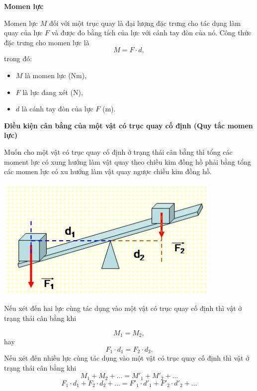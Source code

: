 
\setcounter{section}{0}
\textbf{Momen lực}

Momen lực $M$ đối với một trục quay là đại lượng đặc trưng cho tác dụng làm quay của lực $F$ và được đo bằng tích của lực với cánh tay đòn của nó. Công thức đặc trưng cho momen lực là 
\begin{equation*}
	M = F\cdot d, \label{eq1}
\end{equation*}
trong đó: 
\begin{itemize}
	\item $M$ là momen lực ($\textrm{Nm}$), 
	\item $F$ là lực đang xét ($\textrm{N}$),
	\item $d$ là cánh tay đòn của lực $F$ ($\textrm{m}$).
\end{itemize}

\textbf{Điều kiện cân bằng của một vật có trục quay cố định (Quy tắc momen lực)}

Muốn cho một vật có trục quay cố định ở trạng thái cân bằng thì tổng các moment lực có xung hướng làm vật quay theo chiều kim đồng hồ phải bằng tổng các momen lực có xu hướng làm vật quay ngược chiều kim đồng hồ.

\begin{center}
	\includegraphics[scale=0.5]{../figs/VN10-PH-21-L-016-2-V2-01.png}
\end{center}

Nếu xét đến hai lực cùng tác dụng vào một vật có trục quay cố định thì vật ở trạng thái cân bằng khi

\begin{equation*}
	M_1 = M_2,
\end{equation*}
%
hay
%
\begin{equation*}
	F_1\cdot d_1 = F_2\cdot d_2. \label{eq2}
\end{equation*}
%
Nếu xét đến nhiều lực cùng tác dụng vào một vật có trục quay cố định thì vật ở trạng thái cân bằng khi
%
\begin{equation*}
	M_1+M_2+... = M'_1+M'_2+... 
\end{equation*}
%
\begin{equation*}
	F_1\cdot d_1+F_2\cdot d_2 + ... = F'_1\cdot d'_1 + F'_2\cdot d'_2+...
\end{equation*}
%
